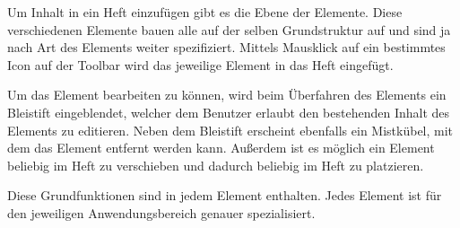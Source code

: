 \cfoot{}
Um Inhalt in ein Heft einzufügen gibt es die Ebene der Elemente. Diese verschiedenen Elemente bauen alle auf der selben Grundstruktur auf und sind ja nach Art des Elements weiter spezifiziert.
Mittels Mausklick auf ein bestimmtes Icon auf der Toolbar wird das jeweilige Element in das Heft eingefügt.

Um das Element bearbeiten zu können, wird beim Überfahren des Elements ein Bleistift eingeblendet, welcher dem Benutzer erlaubt den bestehenden Inhalt des Elements zu editieren. Neben dem Bleistift erscheint ebenfalls ein Mistkübel, mit dem das Element entfernt werden kann.
Außerdem ist es möglich ein Element beliebig im Heft zu verschieben und dadurch beliebig im Heft zu platzieren. 

Diese Grundfunktionen sind in jedem Element enthalten. Jedes Element ist für den jeweiligen Anwendungsbereich genauer spezialisiert.